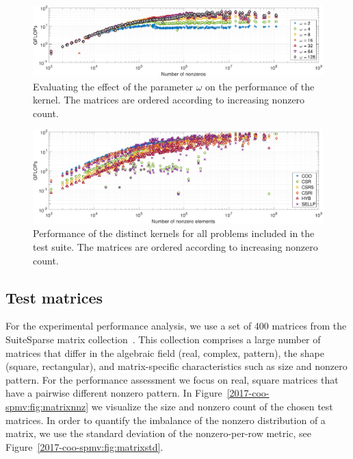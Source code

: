 \begin{figure}
\begin{center}
\includegraphics[width=\columnwidth]{plots/COO_GFLOPS_nnz}
\end{center}
\caption{Evaluating the effect of the parameter $\omega$ on the performance of the \coo kernel. The matrices are ordered according to increasing nonzero count.}
\label{2017-coo-spmv:fig:COOanalysis}
\end{figure}

\begin{figure}
\begin{center}
\includegraphics[width=\columnwidth]{plots/GFLOPS_all_nnz_nnz}
\end{center}
\caption{Performance of the distinct \spmv kernels for all problems included in the test suite. The matrices are ordered according to increasing nonzero count.}
\label{2017-coo-spmv:fig:GFLOPsnnz}
\end{figure}


\subsection{Test matrices}
For the experimental performance analysis, we use a set of 400 matrices from the
SuiteSparse matrix collection~\cite{ufmc}. This collection 
comprises a large number of matrices that differ in the algebraic field (real, complex, pattern),
the shape (square, rectangular), and matrix-specific characteristics such as
size and nonzero pattern.
For the performance assessment we focus on real, square matrices that have a pairwise different nonzero pattern.
In Figure~\ref{2017-coo-spmv:fig:matrixnnz} we visualize the size and nonzero count of the chosen test matrices. 
In order to quantify the imbalance of the nonzero distribution of a matrix,
we use the standard deviation of the nonzero-per-row metric, see Figure~\ref{2017-coo-spmv:fig:matrixstd}.

